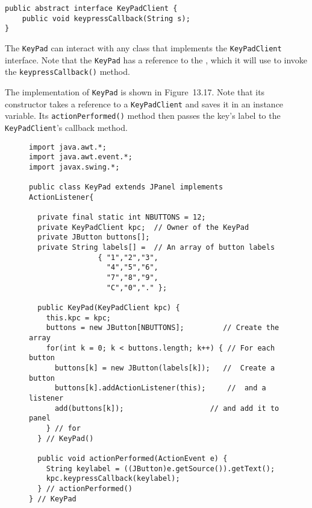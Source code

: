 \begin{jjjlisting}
\begin{lstlisting}
public abstract interface KeyPadClient {
    public void keypressCallback(String s);
}
\end{lstlisting}
\end{jjjlisting}

\noindent The {\tt KeyPad} can interact with any class that implements 
the {\tt Key\-Pad\-Client} interface.  Note that the {\tt KeyPad} has a
reference to the , which it will use to invoke the
{\tt keypressCallback()} method.

The implementation of {\tt KeyPad} is shown in Figure~13.17. 
Note that its constructor takes a reference to a {\tt KeyPadClient}
and saves it in an instance variable. Its {\tt actionPerformed()}
method then passes the key's label to the {\tt KeyPadClient}'s 
callback method.

\begin{figure}[hbt]
\jjjprogstart
\begin{jjjlisting}[29pc]
\begin{lstlisting}
import java.awt.*;
import java.awt.event.*;
import javax.swing.*;

public class KeyPad extends JPanel implements ActionListener{
 
  private final static int NBUTTONS = 12;  
  private KeyPadClient kpc;  // Owner of the KeyPad
  private JButton buttons[];
  private String labels[] =  // An array of button labels
                { "1","2","3",
                  "4","5","6",
                  "7","8","9",
                  "C","0","." };

  public KeyPad(KeyPadClient kpc) {
    this.kpc = kpc;
    buttons = new JButton[NBUTTONS];         // Create the array
    for(int k = 0; k < buttons.length; k++) { // For each button
      buttons[k] = new JButton(labels[k]);   //  Create a button
      buttons[k].addActionListener(this);     //  and a listener
      add(buttons[k]);                    // and add it to panel
    } // for
  } // KeyPad()

  public void actionPerformed(ActionEvent e) {
    String keylabel = ((JButton)e.getSource()).getText();
    kpc.keypressCallback(keylabel);
  } // actionPerformed()
} // KeyPad
\end{lstlisting}
\end{jjjlisting}
\label{fig-keypad}
\end{figure}

